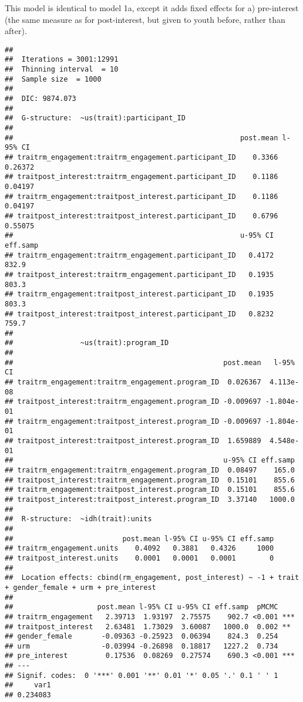 \documentclass[man]{apa6}
\theoremstyle{definition}
\theoremstyle{definition}
\theoremstyle{definition}
\theoremstyle{remark}
\begin{document}
This model is identical to model 1a, except it adds fixed effects for a)
pre-interest (the same measure as for post-interest, but given to youth
before, rather than after).

\begin{verbatim}
## 
##  Iterations = 3001:12991
##  Thinning interval  = 10
##  Sample size  = 1000 
## 
##  DIC: 9874.073 
## 
##  G-structure:  ~us(trait):participant_ID
## 
##                                                      post.mean l-95% CI
## traitrm_engagement:traitrm_engagement.participant_ID    0.3366  0.26372
## traitpost_interest:traitrm_engagement.participant_ID    0.1186  0.04197
## traitrm_engagement:traitpost_interest.participant_ID    0.1186  0.04197
## traitpost_interest:traitpost_interest.participant_ID    0.6796  0.55075
##                                                      u-95% CI eff.samp
## traitrm_engagement:traitrm_engagement.participant_ID   0.4172    832.9
## traitpost_interest:traitrm_engagement.participant_ID   0.1935    803.3
## traitrm_engagement:traitpost_interest.participant_ID   0.1935    803.3
## traitpost_interest:traitpost_interest.participant_ID   0.8232    759.7
## 
##                ~us(trait):program_ID
## 
##                                                  post.mean   l-95% CI
## traitrm_engagement:traitrm_engagement.program_ID  0.026367  4.113e-08
## traitpost_interest:traitrm_engagement.program_ID -0.009697 -1.804e-01
## traitrm_engagement:traitpost_interest.program_ID -0.009697 -1.804e-01
## traitpost_interest:traitpost_interest.program_ID  1.659889  4.548e-01
##                                                  u-95% CI eff.samp
## traitrm_engagement:traitrm_engagement.program_ID  0.08497    165.0
## traitpost_interest:traitrm_engagement.program_ID  0.15101    855.6
## traitrm_engagement:traitpost_interest.program_ID  0.15101    855.6
## traitpost_interest:traitpost_interest.program_ID  3.37140   1000.0
## 
##  R-structure:  ~idh(trait):units
## 
##                          post.mean l-95% CI u-95% CI eff.samp
## traitrm_engagement.units    0.4092   0.3881   0.4326     1000
## traitpost_interest.units    0.0001   0.0001   0.0001        0
## 
##  Location effects: cbind(rm_engagement, post_interest) ~ -1 + trait + gender_female + urm + pre_interest 
## 
##                    post.mean l-95% CI u-95% CI eff.samp  pMCMC    
## traitrm_engagement   2.39713  1.93197  2.75575    902.7 <0.001 ***
## traitpost_interest   2.63481  1.73029  3.60087   1000.0  0.002 ** 
## gender_female       -0.09363 -0.25923  0.06394    824.3  0.254    
## urm                 -0.03994 -0.26898  0.18817   1227.2  0.734    
## pre_interest         0.17536  0.08269  0.27574    690.3 <0.001 ***
## ---
## Signif. codes:  0 '***' 0.001 '**' 0.01 '*' 0.05 '.' 0.1 ' ' 1
##     var1 
## 0.234083
\end{verbatim}
\end{document}
